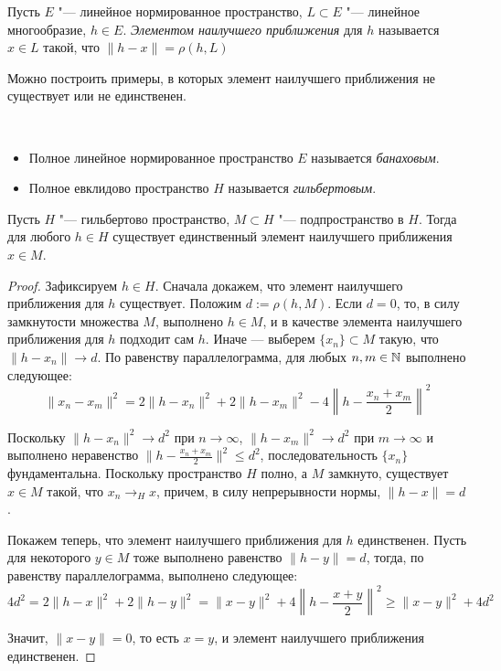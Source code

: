 \begin{definition}
	Пусть $E$ "--- линейное нормированное пространство, $L \subset E$ "--- линейное многообразие, $h \in E$. \textit{Элементом наилучшего приближения} для $h$ называется $x \in L$ такой, что $\|h - x\| = \rho(h, L)$
\end{definition}

\begin{note}
	Можно построить примеры, в которых элемент наилучшего приближения не существует или не единственен.
\end{note}

\begin{definition}~
	\begin{itemize}
		\item Полное линейное нормированное пространство $E$ называется \textit{банаховым}.
		\item Полное евклидово пространство $H$ называется \textit{гильбертовым}.
	\end{itemize}
\end{definition}

\begin{proposition}\label{bestelt}
	Пусть $H$ "--- гильбертово пространство, $M \subset H$ "--- подпространство в $H$. Тогда для любого $h \in H$ существует единственный элемент наилучшего приближения $x \in M$.
\end{proposition}

\begin{proof}
	Зафиксируем $h \in H$. Сначала докажем, что элемент наилучшего приближения для $h$ существует. Положим $d := \rho(h, M)$. Если $d = 0$, то, в силу замкнутости множества $M$, выполнено $h \in M$, и в качестве элемента наилучшего приближения для $h$ подходит сам $h$. Иначе --- выберем $\{x_n\} \subset M$ такую, что $\|h - x_n\| \to d$. По равенству параллелограмма, для любых $n, m \in \mathbb{N}$ выполнено следующее:
	\[\|x_n - x_m\|^2 = 2\|h - x_n\|^2 + 2\|h - x_m\|^2 - 4\left\|h - \frac{x_n + x_m}{2}\right\|^2\]

	Поскольку $\|h - x_n\|^2 \to d^2$ при $n \to \infty$, $\|h - x_m\|^2 \to d^2$ при $m \to \infty$ и выполнено неравенство $\|h - \frac{x_n + x_m}{2}\|^2 \le d^2$, последовательность $\{x_n\}$ фундаментальна. Поскольку пространство $H$ полно, а $M$ замкнуто, существует $x \in M$ такой, что $x_n \to_H x$, причем, в силу непрерывности нормы, $\|h - x\| = d$.

	Покажем теперь, что элемент наилучшего приближения для $h$ единственен. Пусть для некоторого $y \in M$ тоже выполнено равенство $\|h - y\| = d$, тогда, по равенству параллелограмма, выполнено следующее:
	\[4d^2 = 2\|h - x\|^2 + 2\|h - y\|^2 = \|x - y\|^2 + 4\left\|h - \frac{x+y}{2}\right\|^2 \ge \|x - y\|^2 + 4d^2\]

	Значит, $\|x - y\| = 0$, то есть $x = y$, и элемент наилучшего приближения единственен.
\end{proof}

